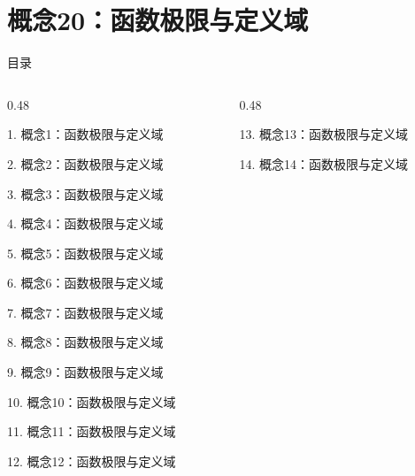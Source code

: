 \documentclass[aspectratio=169,10pt,fontset=fandol]{ctexbeamer}
\begin{document}
\section{概念20：函数极限与定义域}
\begin{frame}[t,fragile]{目录}
\small
\begin{columns}[T,onlytextwidth]
\begin{column}{0.48\textwidth}
{\color{black}\small 1. 概念1：函数极限与定义域\par}\vspace{0.22em}
{\color{black}\small 2. 概念2：函数极限与定义域\par}\vspace{0.22em}
{\color{black}\small 3. 概念3：函数极限与定义域\par}\vspace{0.22em}
{\color{black}\small 4. 概念4：函数极限与定义域\par}\vspace{0.22em}
{\color{black}\small 5. 概念5：函数极限与定义域\par}\vspace{0.22em}
{\color{black}\small 6. 概念6：函数极限与定义域\par}\vspace{0.22em}
{\color{black}\small 7. 概念7：函数极限与定义域\par}\vspace{0.22em}
{\color{black}\small 8. 概念8：函数极限与定义域\par}\vspace{0.22em}
{\color{black}\small 9. 概念9：函数极限与定义域\par}\vspace{0.22em}
{\color{black}\small 10. 概念10：函数极限与定义域\par}\vspace{0.22em}
{\color{black}\small 11. 概念11：函数极限与定义域\par}\vspace{0.22em}
{\color{black}\small 12. 概念12：函数极限与定义域\par}\vspace{0.22em}
\end{column}
\begin{column}{0.48\textwidth}
{\color{black}\small 13. 概念13：函数极限与定义域\par}\vspace{0.22em}
{\color{black}\small 14. 概念14：函数极限与定义域\par}\vspace{0.22em}

\end{column}
\end{columns}
\end{frame}
\end{document}
